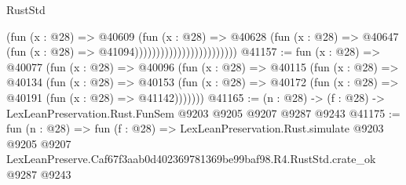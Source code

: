 \begin{lexlean}{RustStd}
\begin{coremodule}
                                            (fun (x : @28) =>
                                            @40609
                                              (fun (x : @28) =>
                                              @40628
                                                (fun (x : @28) =>
                                                @40647
                                                  (fun (x : @28) => @41094))))))))))))))))))))))))
@41157 := fun (x : @28) =>
  @40077
    (fun (x : @28) =>
    @40096
      (fun (x : @28) =>
      @40115
        (fun (x : @28) =>
        @40134
          (fun (x : @28) =>
          @40153 (fun (x : @28) => @40172 (fun (x : @28) => @40191 (fun (x : @28) => @41142)))))))
@41165 := (n : @28) -> (f : @28) -> LexLeanPreservation.Rust.FunSem @9203 @9205 @9207 @9287 @9243
@41175 := fun (n : @28) =>
  fun (f : @28) =>
  LexLeanPreservation.Rust.simulate
    @9203
    @9205
    @9207
    LexLeanPreserve.Caf67f3aab0d402369781369be99baf98.R4.RustStd.crate_ok
    @9287
    @9243
\end{coremodule}
\end{lexlean}
